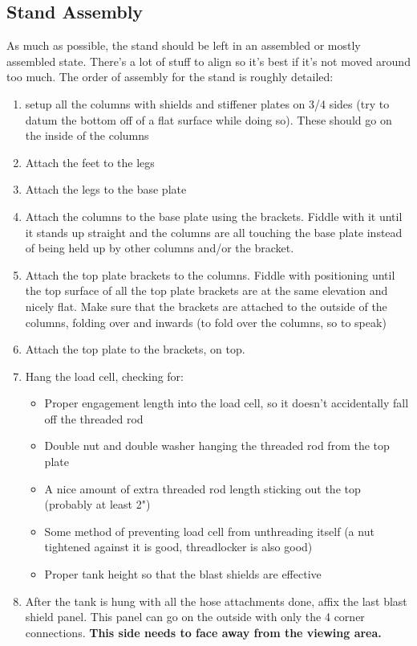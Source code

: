 \documentclass[11pt]{article}
\begin{document}
\subsection{Stand Assembly}
As much as possible, the stand should be left in an assembled or mostly assembled state. There's a lot of stuff to align so it's best if it's not moved around too much. The order of assembly for the stand is roughly detailed:
\begin{enumerate}
	\item setup all the columns with shields and stiffener plates on 3/4 sides (try to datum the bottom off of a flat surface while doing so). These should go on the inside of the columns
	\item Attach the feet to the legs
	\item Attach the legs to the base plate
	\item Attach the columns to the base plate using the brackets. Fiddle with it until it stands up straight and the columns are all touching the base plate instead of being held up by other columns and/or the bracket.
	\item Attach the top plate brackets to the columns. Fiddle with positioning until the top surface of all the top plate brackets are at the same elevation and nicely flat. Make sure that the brackets are attached to the outside of the columns, folding over and inwards (to fold over the columns, so to speak)
	\item Attach the top plate to the brackets, on top.
	\item Hang the load cell, checking for:
		\begin{itemize}
			\item Proper engagement length into the load cell, so it doesn't accidentally fall off the threaded rod
			\item Double nut and double washer hanging the threaded rod from the top plate
			\item A nice amount of extra threaded rod length sticking out the top (probably at least 2")
			\item Some method of preventing load cell from unthreading itself (a nut tightened against it is good, threadlocker is also good)
			\item Proper tank height so that the blast shields are effective
		\end{itemize}
	\item After the tank is hung with all the hose attachments done, affix the last blast shield panel. This panel can go on the outside with only the 4 corner connections. \textbf{This side needs to face away from the viewing area.}
\end{enumerate}
\end{document}
